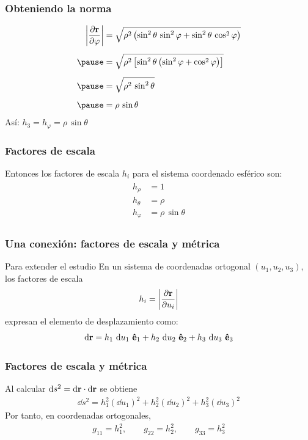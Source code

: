 \documentclass[12pt]{beamer}
\begin{document}
\begin{frame}
\frametitle{Obteniendo la norma}
\begin{eqnarray*}
\begin{aligned}
\abs{\pdv{\vb{r}}{\varphi}} &= \sqrt{\rho^{2} \left( \sin^{2} \theta \, \sin^{2} \varphi + \sin^{2} \theta \, \cos^{2} \varphi \right)} \\[0.5em] \pause
&= \sqrt{\rho^{2} \left[ \sin^{2} \theta \left( \sin^{2} \varphi + \cos^{2} \varphi \right) \right]} \\[0.5em] \pause
&= \sqrt{\rho^{2} \, \sin^{2} \theta} \\[0.5em] \pause
&= \rho \, \sin \theta
\end{aligned}
\end{eqnarray*}
\pause
Así: $h_{3} = h_{\varphi} = \rho \, \sin \theta$
\end{frame}
\begin{frame}
\frametitle{Factores de escala}
Entonces los factores de escala $h_{i}$ para el sistema coordenado esférico son:
\pause
\begin{align}
\begin{aligned}
h_{\rho} &= 1 \\[0.5em]
h_{\theta} &= \rho \\[0.5em]
h_{\varphi} &= \rho \, \sin \theta
\end{aligned}
\label{eq:ecuacion_01_07}
\end{align}
\end{frame}
\begin{frame}
\frametitle{Una conexión: factores de escala y métrica}
\begin{block}{Para extender el estudio}
En un sistema de coordenadas ortogonal
$\left( u_{1}, u_{2}, u_{3} \right)$, los factores de escala
\pause
\begin{align*}
   h_{i} = \abs{\pdv{\vb{r}}{u_{i}}}
\end{align*}
\pause
expresan el elemento de desplazamiento como:
\pause
\begin{align*}
\dd{\vb{r}} = h_{1} \,\dd{u_{1}} \, \vu{e}_{1} + h_{2} \,\dd{u_{2}} \, \vu{e}_{2} + h_{3} \,\dd{u_{3}} \, \vu{e}_{3}
\end{align*}
\end{block}
\end{frame}
\begin{frame}
\frametitle{Factores de escala y métrica}
Al calcular $\dd{s^{2}} = \dd{\vb{r}} \cdot \dd{\vb{r}}$ se obtiene
\pause
\begin{align*}
\boxed{
   \dd{s^{2}} = h_{1}^{2} (\dd{u}_{1})^{2} + h_{2}^{2} (\dd{u}_{2})^{2} + h_{3}^{2} (\dd{u}_{3})^{2}
}
\end{align*}
\pause
Por tanto, en coordenadas ortogonales,
\begin{align*}
\boxed{
   g_{11} = h_{1}^{2}, \qquad g_{22} = h_{2}^{2}, \qquad g_{33} = h_{3}^{2}
   }
\end{align*}
\end{frame}
\end{document}
